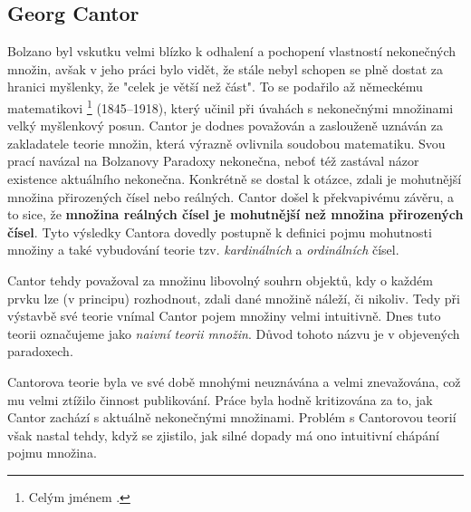 \subsection{Georg Cantor}\label{subsec:cantor}
Bolzano byl vskutku velmi blízko k odhalení a pochopení vlastností nekonečných množin, avšak v jeho práci bylo vidět, že stále nebyl schopen se plně dostat za hranici myšlenky, že "celek je větší než část". To se podařilo až německému matematikovi \footnote{Celým jménem .} (1845--1918), který učinil při úvahách s nekonečnými množinami velký myšlenkový posun. Cantor je dodnes považován a zaslouženě uznáván za zakladatele teorie množin, která výrazně ovlivnila soudobou matematiku. Svou prací navázal na Bolzanovy Paradoxy nekonečna, neboť též zastával názor existence aktuálního nekonečna. Konkrétně se dostal k otázce, zdali je mohutnější množina přirozených čísel nebo reálných. Cantor došel k překvapivému závěru, a to sice, že \textbf{množina reálných čísel je mohutnější než množina přirozených čísel}. Tyto výsledky Cantora dovedly postupně k definici pojmu mohutnosti množiny a také vybudování teorie tzv. \emph{kardinálních} a \emph{ordinálních} čísel.\par
Cantor tehdy považoval za množinu libovolný souhrn objektů, kdy o každém prvku lze (v principu) rozhodnout, zdali dané množině náleží, či nikoliv. Tedy při výstavbě své teorie vnímal Cantor pojem množiny velmi intuitivně. Dnes tuto teorii označujeme jako \emph{naivní teorii množin}. Důvod tohoto názvu je v objevených paradoxech.\par
Cantorova teorie byla ve své době mnohými neuznávána a velmi znevažována, což mu velmi ztížilo činnost publikování. Práce byla hodně kritizována za to, jak Cantor zachází s aktuálně nekonečnými množinami. Problém s Cantorovou teorií však nastal tehdy, když se zjistilo, jak silné dopady má ono intuitivní chápání pojmu množina.

